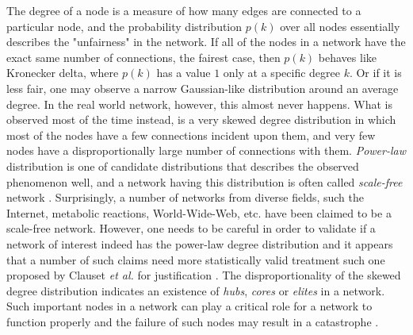 \documentclass[..]{revtex4}
\begin{document}
	 The degree of a node is a measure of how many edges are connected to a particular node, and the probability distribution $p(k)$ over all nodes essentially describes the "unfairness" in the network. If all of the nodes in a network have the exact same number of connections, the fairest case, then $p(k)$ behaves like Kronecker delta, where $p(k)$ has a value $1$ only at a specific degree $k$. Or if it is less fair, one may observe a narrow Gaussian-like distribution around an average degree. In the real world network, however, this almost never happens. What is observed most of the time instead, is a very skewed degree distribution in which most of the nodes have a few connections incident upon them, and very few nodes have a disproportionally large number of connections with them. \textit{Power-law} distribution is one of candidate distributions that describes the observed phenomenon well, and a network having this distribution is often called \textit{scale-free} network \cite{Barabasi99emergenceScaling}. Surprisingly, a number of networks  from diverse fields, such the Internet, metabolic reactions, World-Wide-Web, etc. have been claimed to be a scale-free network. However, one needs to be careful in order to validate if a network of interest indeed has the power-law degree distribution and it appears that a number of such claims need more statistically valid treatment such one proposed by Clauset \textit{et al.} for justification \cite{Clauset:PowerLaw}. The disproportionality of the skewed degree distribution indicates an existence of  \textit{hubs}, \textit{cores} or \textit{elites} in a network. Such important nodes in a network can play a critical role for a network to function properly and the failure of such nodes may result in a catastrophe \cite{ScaleFreeAttack}.
	
\end{document}
